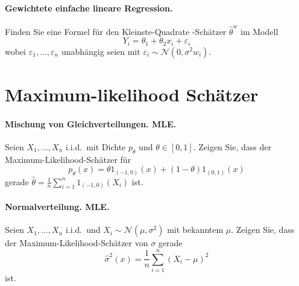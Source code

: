 \paragraph{Gewichtete einfache lineare Regression. }
Finden Sie eine Formel für den Kleinste-Quadrate -Schätzer $\hat \theta^w$
im Modell
\begin{equation*}
	Y_i = \theta_1 + \theta_2 x_i + \varepsilon_i
\end{equation*}
wobei $\varepsilon_1,\ldots, \varepsilon_n$ unabhängig seien mit $\varepsilon_i \sim \mathcal N(0, \sigma^2w_i)$.



\section{Maximum-likelihood Schätzer}

\paragraph{Mischung von Gleichverteilungen. MLE.}
Seien $X_1,\ldots,X_n$ i.i.d.\ mit Dichte $p_\theta$ 
und $\theta\in \left[ 0,1 \right]$. Zeigen Sie, dass der Maximum-Likelihood-Schätzer
für
\begin{equation*}
	p_\theta (x) = \theta 1_{\left( -1,0 \right)}(x) + \left( 1-\theta \right)1_{\left( 0,1 \right)}(x)
\end{equation*}
gerade $\hat \theta = \frac{1}{n} \sum_{i=1}^{n} 1_{(-1,0)}\left( X_i \right)$ ist.



\paragraph{Normalverteilung. MLE.}
Seien $X_1,\ldots,X_n$ i.i.d.\ und $X_i \sim \mathcal N\left( \mu, \sigma^2 \right)$ mit bekanntem $\mu$. 
Zeigen Sie, dass der Maximum-Likelihood-Schätzer von $\sigma$ gerade
\begin{equation*}
	\hat \sigma^2 (x) = \frac{1}{n} \sum_{i=1}^{n} (X_i - \mu)^2  
\end{equation*}
ist.


